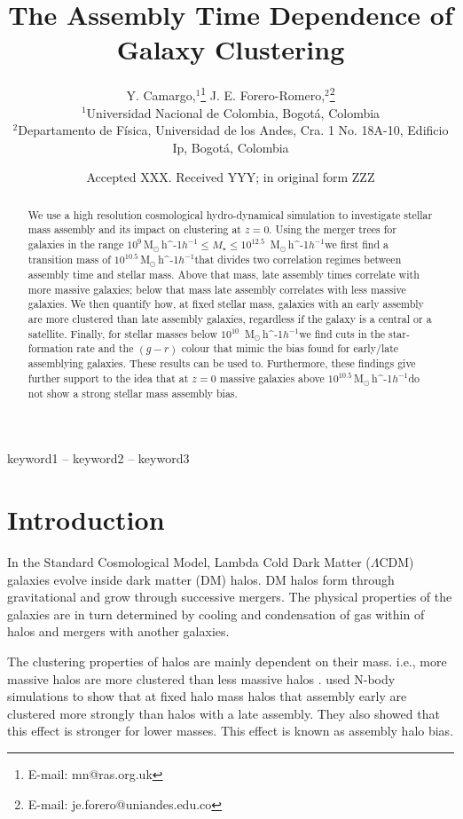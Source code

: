 \documentclass[fleqn,usenatbib]{mnras}
\title[Galaxy Assembly Bias]{The Assembly Time Dependence of Galaxy Clustering}
\author[Camargo, Y. \& Forero-Romero J. E.]{
Y. Camargo,$^{1}$\thanks{E-mail: mn@ras.org.uk}
J. E. Forero-Romero,$^{2}$\thanks{E-mail: je.forero@uniandes.edu.co}
\\
$^{1}$Universidad Nacional de Colombia, Bogot\'a, Colombia\\
$^{2}$Departamento de F\'isica, Universidad de los Andes, Cra. 1 No.
18A-10, Edificio Ip, Bogot\'a, Colombia\\
}
\date{Accepted XXX. Received YYY; in original form ZZZ}
\newcommand{\Msunh}{\,{\rm M}$_{\odot}$\,\ifmmode h^{-1}\else $h^{-1}$\fi}
\begin{document}
\label{firstpage}
\pagerange{\pageref{firstpage}--\pageref{lastpage}}
\maketitle

\begin{abstract}
    We use a high resolution cosmological hydro-dynamical simulation
    to investigate stellar mass assembly 
    and its impact on clustering at $z=0$.
    Using the merger trees for galaxies in the range $10^{9}$\Msunh $\leq M_{\star} \leq 10^{12.5}$ \Msunh we first find a transition mass of $10^{10.5}$\Msunh that divides two
    correlation regimes between assembly time and stellar mass.
    Above that mass, late assembly times correlate with more massive
    galaxies; below that mass late assembly correlates with less massive
galaxies.
We then quantify how, at fixed stellar mass, galaxies with an early
assembly
are more clustered than late assembly galaxies, regardless if the galaxy
is a central or a satellite.
Finally, for stellar masses below $10^{10}$ \Msunh we find 
cuts in the star-formation rate and the $(g-r)$ colour that mimic
the bias found for early/late assemblying galaxies.
These results can be used to.
Furthermore, these findings give further support to the idea that at
$z=0$  massive galaxies above $10^{10.5}$\Msunh do not show a strong
stellar mass assembly bias.
\end{abstract}

\begin{keywords}
keyword1 -- keyword2 -- keyword3
\end{keywords}



\section{Introduction}
In the Standard Cosmological Model, Lambda Cold Dark Matter
($\Lambda$CDM) galaxies evolve inside dark matter (DM) halos.
DM halos form through gravitational and grow through successive
mergers.
The physical properties of the galaxies are in turn determined by
cooling and condensation of gas within of halos and mergers with
another galaxies.

The clustering properties of halos are mainly dependent on their mass.
i.e., more massive halos are more clustered than
less massive halos \citep{1984ApJ...284L...9K}.
\cite{2005MNRAS.363L..66G} used N-body simulations to show that at
fixed halo mass halos that assembly early are clustered more strongly
than halos with a late assembly.
They also showed that this effect is stronger for lower masses.
This effect is known as assembly halo bias.
\end{document}
